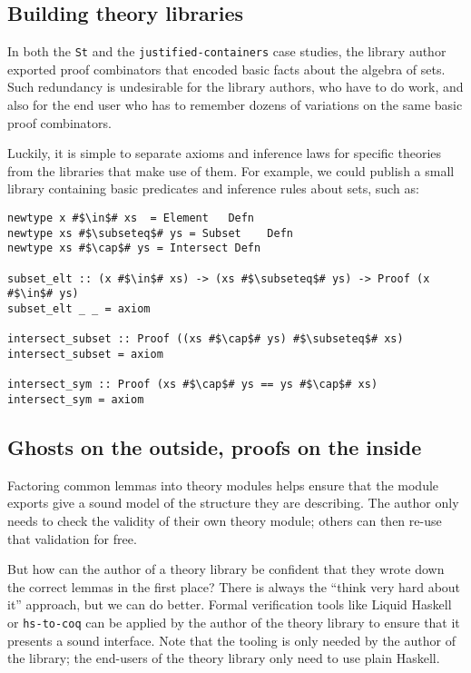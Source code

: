 \documentclass[format=sigplan, review=false, screen=true]{acmart}
\begin{document}
\subsection{Building theory libraries}
In both the \texttt{St} and the \texttt{justified-containers} case studies,
the library author exported proof combinators that encoded basic facts about
the algebra of sets. Such redundancy is undesirable for the library authors,
who have to do work, and also for the end user who has to remember dozens of
variations on the same basic proof combinators.

Luckily, it is simple to separate axioms and inference laws for specific theories
from the libraries that make use of them. For example, we could publish a small
library containing basic predicates and inference rules about sets, such as:
\begin{verbatim}
newtype x #$\in$# xs  = Element   Defn
newtype xs #$\subseteq$# ys = Subset    Defn
newtype xs #$\cap$# ys = Intersect Defn

subset_elt :: (x #$\in$# xs) -> (xs #$\subseteq$# ys) -> Proof (x #$\in$# ys)
subset_elt _ _ = axiom

intersect_subset :: Proof ((xs #$\cap$# ys) #$\subseteq$# xs)
intersect_subset = axiom

intersect_sym :: Proof (xs #$\cap$# ys == ys #$\cap$# xs)
intersect_sym = axiom
\end{verbatim}

\subsection{Ghosts on the outside, proofs on the inside}
Factoring common lemmas into theory modules helps ensure that
the module exports give a sound model of the structure they are
describing. The author only needs to check the validity of their own
theory module; others can then re-use that validation for free.

But how can the author of a theory library be confident that they wrote down
the correct lemmas in the first place? There is always the ``think very hard
about it'' approach, but we can do better. Formal verification tools like
Liquid Haskell \cite{vazou2016liquid} or \texttt{hs-to-coq} \cite{spector2018total}
can be applied by the author of the theory library to ensure that it presents a
sound interface. Note that the tooling is only needed by the author of the library;
the end-users of the theory library only need to use plain Haskell.
\end{document}
